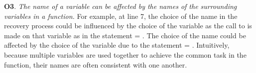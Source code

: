 







\textbf{O3}. {\em The name of a variable can be affected by the names
  of the surrounding variables in a function.}  For example, at line
7, the choice of the name  in the recovery process could
be influenced by the choice of the variable  as the
call to  is made on that variable as in the statement
 = . The choice of the name
 could be affected by the choice of the
variable  due to the statement  =
.
%
Intuitively, because multiple variables are used together to achieve
the common task in the function, their names are often consistent with
one another.



